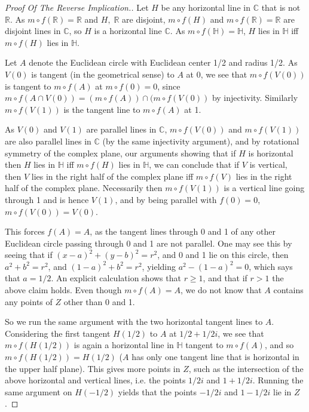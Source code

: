 \documentclass[12pt]{article}
\theoremstyle{definitionstyle}
\def\mbb#1{\mathbb{#1}}
\def \C{\mbb{C}}
\def \R{\mbb{R}}
\renewcommand{\H}{\mbb H}
\begin{document}
\begin{proof}[Proof Of The Reverse Implication.]
		Let $H$ be any horizontal line in $\C$ that is not $\R$. As $m \circ f(\R) = \R$ and $H,\; \R$ are disjoint, $m \circ f(H)$ and $m \circ f(\R) = \R$ are disjoint lines in $\C$, so $H$ is a horizontal line $\C$. As $m \circ f(\H) = \H$, $H$ lies in $\H$ iff $m \circ f(H)$ lies in $\H$.
		
		Let $A$ denote the Euclidean circle with Euclidean center 1/2 and radius 1/2. As $V(0)$ is tangent (in the geometrical sense) to $A$ at 0, we see that $m \circ f(V(0))$ is tangent to $m \circ f(A)$ at $m \circ f(0) = 0$, since $m \circ f(A \cap V(0)) = (m \circ f(A)) \cap (m \circ f(V(0))$ by injectivity. Similarly $m \circ f(V(1))$ is the tangent line to $m \circ f(A)$ at 1.
		
		As $V(0)$ and $V(1)$ are parallel lines in $\C$, $m \circ f(V(0))$ and $m \circ f(V(1))$ are also parallel lines in $\C$ (by the same injectivity argument), and by rotational symmetry of the complex plane, our arguments showing that if $H$ is horizontal then $H$ lies in $\mbb H$ iff $m \circ f(H)$ lies in $\mbb H$, we can conclude that if $V$ is vertical, then $V$ lies in the right half of the complex plane iff $m \circ f(V)$ lies in the right half of the complex plane. Necessarily then $m \circ f(V(1))$ is a vertical line going through 1 and is hence $V(1)$, and by being parallel with $f(0) = 0$, $m \circ f(V(0)) = V(0)$.
		
		This forces $f(A) = A$, as the tangent lines through 0 and 1 of any other Euclidean circle passing through 0 and 1 are not parallel. One may see this by seeing that if $(x-a)^2+(y-b)^2 = r^2$, and 0 and 1 lie on this circle, then $a^2 + b^2 = r^2$, and $(1-a)^2 + b^2 = r^2$, yielding $a^2 - (1-a)^2 = 0$, which says that $a=1/2$. An explicit calculation shows that $r \geq 1$, and that if $r > 1$ the above claim holds. Even though $m \circ f(A) = A$, we do not know that $A$ contains any points of $Z$ other than 0 and 1.
		
		So we run the same argument with the two horizontal tangent lines to $A$. Considering the first tangent $H(1/2)$ to $A$ at $1/2 + 1/2 i$, we see that $m \circ f(H(1/2))$ is again a horizontal line in $\H$ tangent to $m \circ f(A)$, and so $m \circ f(H(1/2)) = H(1/2)$ ($A$ has only one tangent line that is horizontal in the upper half plane). This gives more points in $Z$, such as the intersection of the above horizontal and vertical lines, i.e. the points $1/2i$ and $1 + 1/2 i$. Running the same argument on $H(-1/2)$ yields that the points $-1/2i$ and $1 - 1/2i$ lie in $Z$. 
		

\end{proof}
\end{document}
